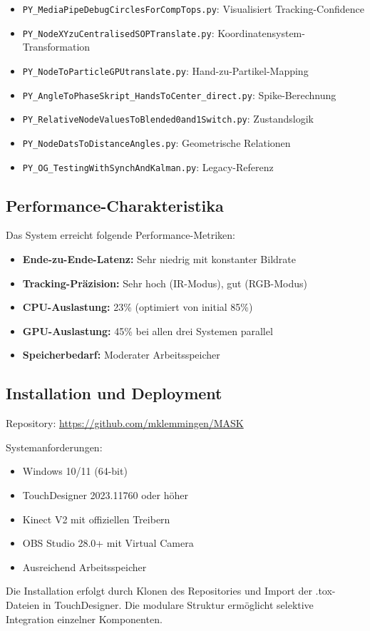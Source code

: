 \begin{itemize}
    \item \texttt{PY\_MediaPipeDebugCirclesForCompTops.py}: Visualisiert Tracking-Confidence
    \item \texttt{PY\_NodeXYzuCentralisedSOPTranslate.py}: Koordinatensystem-Transformation
    \item \texttt{PY\_NodeToParticleGPUtranslate.py}: Hand-zu-Partikel-Mapping
    \item \texttt{PY\_AngleToPhaseSkript\_HandsToCenter\_direct.py}: Spike-Berechnung
    \item \texttt{PY\_RelativeNodeValuesToBlended0and1Switch.py}: Zustandslogik
    \item \texttt{PY\_NodeDatsToDistanceAngles.py}: Geometrische Relationen
    \item \texttt{PY\_OG\_TestingWithSynchAndKalman.py}: Legacy-Referenz
\end{itemize}

\subsection*{Performance-Charakteristika}


Das System erreicht folgende Performance-Metriken:
\begin{itemize}
    \item \textbf{Ende-zu-Ende-Latenz:} Sehr niedrig mit konstanter Bildrate
    \item \textbf{Tracking-Präzision:} Sehr hoch (IR-Modus), gut (RGB-Modus)
    \item \textbf{CPU-Auslastung:} 23\% (optimiert von initial 85\%)
    \item \textbf{GPU-Auslastung:} 45\% bei allen drei Systemen parallel
    \item \textbf{Speicherbedarf:} Moderater Arbeitsspeicher
\end{itemize}

\subsection*{Installation und Deployment}

Repository: \url{https://github.com/mklemmingen/MASK}

Systemanforderungen:
\begin{itemize}
    \item Windows 10/11 (64-bit)
    \item TouchDesigner 2023.11760 oder höher
    \item Kinect V2 mit offiziellen Treibern
    \item OBS Studio 28.0+ mit Virtual Camera
    \item Ausreichend Arbeitsspeicher
\end{itemize}

Die Installation erfolgt durch Klonen des Repositories und Import der .tox-Dateien in TouchDesigner. Die modulare Struktur ermöglicht selektive Integration einzelner Komponenten.